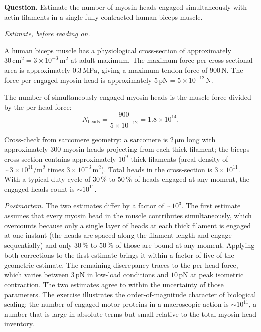 \begin{estimation}
\textbf{Question.} Estimate the number of myosin heads engaged
simultaneously with actin filaments in a single fully contracted
human biceps muscle.

\smallskip
\textit{Estimate, before reading on.}

\smallskip
A human biceps muscle has a physiological cross-section of
approximately $30\,\text{cm}^2 = 3 \times 10^{-3}\,\text{m}^2$ at
adult maximum. The maximum force per cross-sectional area is
approximately $0.3\,\text{MPa}$, giving a maximum tendon force of
$900\,\text{N}$. The force per engaged myosin head is approximately
$5\,\text{pN} = 5 \times 10^{-12}\,\text{N}$.

The number of simultaneously engaged myosin heads is the muscle force
divided by the per-head force:
\[
N_{\text{heads}} = \frac{900}{5 \times 10^{-12}} = 1.8 \times 10^{14}.
\]

Cross-check from sarcomere geometry: a sarcomere is
$2\,\si{\micro\meter}$ long with approximately $300$ myosin heads
projecting from each thick filament; the biceps cross-section
contains approximately $10^9$ thick filaments (areal density of
$\sim 3 \times 10^{11}/\text{m}^2$ times $3 \times 10^{-3}\,\text{m}^2$).
Total heads in the cross-section is $3 \times 10^{11}$. With a typical
duty cycle of $30\,\%$ to $50\,\%$ of heads engaged at any moment, the
engaged-heads count is $\sim 10^{11}$.

\smallskip
\textit{Postmortem.} The two estimates differ by a factor of
$\sim 10^3$. The first estimate assumes that every myosin head in the
muscle contributes simultaneously, which overcounts because only a
single layer of heads at each thick filament is engaged at one
instant (the heads are spaced along the filament length and engage
sequentially) and only $30\,\%$ to $50\,\%$ of those are bound at any
moment. Applying both corrections to the first estimate brings it
within a factor of five of the geometric estimate. The remaining
discrepancy traces to the per-head force, which varies between
$3\,\text{pN}$ in low-load conditions and $10\,\text{pN}$ at peak
isometric contraction. The two estimates agree to within the
uncertainty of those parameters. The exercise illustrates the
order-of-magnitude character of biological scaling: the number of
engaged motor proteins in a macroscopic action is $\sim 10^{11}$, a
number that is large in absolute terms but small relative to the
total myosin-head inventory.
\end{estimation}

